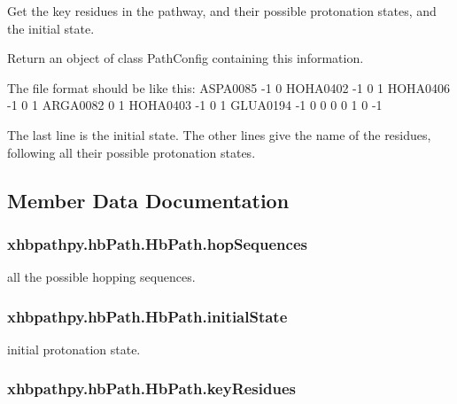 Get the key residues in the pathway, and their possible protonation states, and the initial state. 

Return an object of class Path\-Config containing this information. \begin{DoxyVerb}    The file format should be like this:
    ASPA0085  -1  0
    HOHA0402  -1  0  1
    HOHA0406  -1  0  1
    ARGA0082   0  1
    HOHA0403  -1  0  1
    GLUA0194  -1  0
     0 0 0 1 0 -1

     The last line is the initial state.
     The other lines give the name of the residues, following all their possible protonation states.\end{DoxyVerb}
 

\subsection{Member Data Documentation}
\hypertarget{classxhbpathpy_1_1hb_path_1_1_hb_path_a35382dbb6cd72418f95343650fde976e}{
\subsubsection[{hop\-Sequences}]{\setlength{\rightskip}{0pt plus 5cm}xhbpathpy.\-hb\-Path.\-Hb\-Path.\-hop\-Sequences}}\label{classxhbpathpy_1_1hb_path_1_1_hb_path_a35382dbb6cd72418f95343650fde976e}


all the possible hopping sequences. 

\hypertarget{classxhbpathpy_1_1hb_path_1_1_hb_path_a702f32f452e98cca922244b5d003861a}{
\subsubsection[{initial\-State}]{\setlength{\rightskip}{0pt plus 5cm}xhbpathpy.\-hb\-Path.\-Hb\-Path.\-initial\-State}}\label{classxhbpathpy_1_1hb_path_1_1_hb_path_a702f32f452e98cca922244b5d003861a}


initial protonation state. 

\hypertarget{classxhbpathpy_1_1hb_path_1_1_hb_path_aafe90d4a4166ba875aab2cee3012cd69}{
\subsubsection[{key\-Residues}]{\setlength{\rightskip}{0pt plus 5cm}xhbpathpy.\-hb\-Path.\-Hb\-Path.\-key\-Residues}}\label{classxhbpathpy_1_1hb_path_1_1_hb_path_aafe90d4a4166ba875aab2cee3012cd69}


